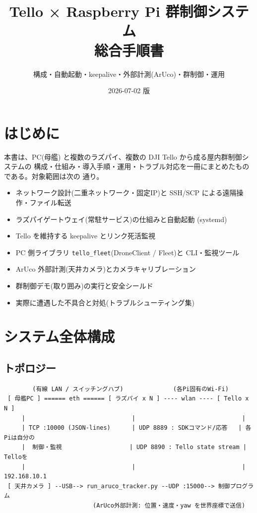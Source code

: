 \documentclass[11pt,a4paper]{ltjsarticle}
\title{\textbf{Tello × Raspberry Pi 群制御システム\\ 総合手順書}}
\author{構成・自動起動・keepalive・外部計測(ArUco)・群制御・運用}
\date{2026-07-02 版}
\newcommand{\code}[1]{\texttt{\small #1}}
\begin{document}
\maketitle
\tableofcontents
\newpage

\section{はじめに}
本書は、PC(母艦) と複数のラズパイ、複数の DJI Tello から成る屋内群制御システムの
構成・仕組み・導入手順・運用・トラブル対応を一冊にまとめたものである。対象範囲は次の
通り。

\begin{itemize}[leftmargin=1.4em]
  \item ネットワーク設計(二重ネットワーク・固定IP)と SSH/SCP による遠隔操作・ファイル転送
  \item ラズパイゲートウェイ(常駐サービス)の仕組みと自動起動 (systemd)
  \item Tello を維持する keepalive とリンク死活監視
  \item PC 側ライブラリ \code{tello\_fleet}(DroneClient / Fleet)と CLI・監視ツール
  \item ArUco 外部計測(天井カメラ)とカメラキャリブレーション
  \item 群制御デモ(取り囲み)の実行と安全シールド
  \item 実際に遭遇した不具合と対処(トラブルシューティング集)
\end{itemize}

\section{システム全体構成}

\subsection{トポロジー}
\begin{lstlisting}
        (有線 LAN / スイッチングハブ)              (各Pi固有のWi-Fi)
 [ 母艦PC ] ====== eth ====== [ ラズパイ x N ] ---- wlan ---- [ Tello x N ]
     |                              |                              |
     | TCP :10000 (JSON-lines)      | UDP 8889 : SDKコマンド/応答   | 各Piは自分の
     |  制御・監視                   | UDP 8890 : Tello state stream |  Telloを
     |                              |                              | 192.168.10.1
 [ 天井カメラ ] --USB--> run_aruco_tracker.py --UDP :15000--> 制御プログラム
                         (ArUco外部計測: 位置・速度・yaw を世界座標で送信)
\end{lstlisting}
\end{document}
